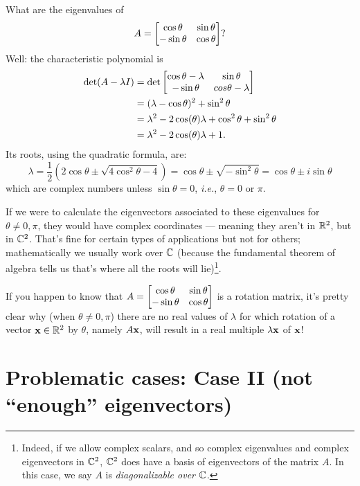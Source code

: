 \begin{myexample} What are the eigenvalues of 
$$
A = \left[ \begin{matrix} \cos \theta & \sin \theta \\ -\sin \theta & \cos \theta \end{matrix} \right]?
$$
Well:  the characteristic polynomial is
\begin{align*}
\det( A-\lambda I )& = \det\left[ \begin{matrix}  \cos \theta-\lambda  & \sin \theta \\ -\sin \theta & cos \theta-\lambda \end{matrix} \right]\\
& = (\lambda-\cos \theta)^2 + \sin^2\theta\\&= \lambda^2 -2\cos(\theta)\lambda + \cos^2\theta + \sin^2\theta\\
&= \lambda^2 -2\cos(\theta)\lambda +1.
\end{align*}
Its roots, using the quadratic formula, are:
$$
\lambda = \frac{1}{2}\left(2\cos\theta \pm \sqrt{4\cos^2\theta - 4}\right)
= \cos\theta \pm \sqrt{-\sin^2\theta} = \cos\theta \pm i \sin\theta
$$
which are complex numbers unless $\sin \theta=0$, \emph{i.e.}, $\theta=0$ or $\pi$.  

If we were to calculate the eigenvectors associated to these
eigenvalues for $\theta\not=0, \pi$, they would have complex coordinates --- meaning
they aren't in $\mathbb{R}^2$, but in $\mathbb{C}^2$.  That's fine for 
certain types of applications but not for others; mathematically
we usually work over $\mathbb{C}$ (because the fundamental theorem
of algebra tells us that's where all the roots will lie)\footnote{\label{diagC}Indeed, if we allow complex scalars, and so complex eigenvalues and complex eigenvectors in $\mathbb{C}^2$, $\mathbb{C}^2$ does have a basis of eigenvectors of the matrix $A$. In this case, we say $A$ is {\it diagonalizable over $\mathbb{C}$.}}.

If you happen to know that  $
A = \left[ \begin{matrix} \cos \theta & \sin \theta \\ -\sin \theta & \cos \theta \end{matrix} \right]
$ is a rotation matrix, it's pretty clear why (when $\theta\not=0, \pi$) there are no real values of $\lambda$ for which rotation of a vector $\mathbf{x} \in \mathbb{R}^2$ by $\theta$, namely $A\mathbf{x}$,  will result in a real multiple $\lambda \mathbf{x}$ of $\mathbf{x}$!
\end{myexample}



\section{Problematic cases: Case II (not ``enough'' eigenvectors)}

